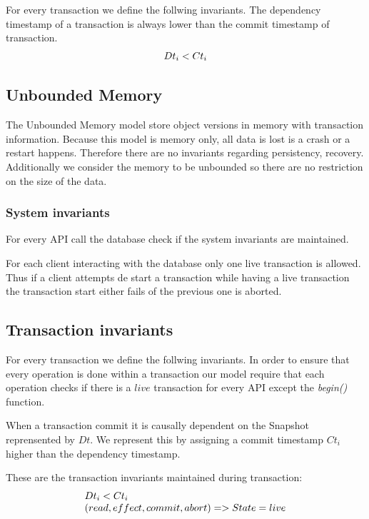 \documentclass[parallelisme]{compas2022}
\begin{document}
For every transaction we define the follwing invariants.
The dependency timestamp of a transaction is always lower than the commit timestamp of transaction.
\[
  \begin{array}{lcl}
    \emph{$Dt_i < Ct_i$}
  \end{array} 
\]

\subsection{Unbounded Memory}

The Unbounded Memory model store object versions in memory with transaction information.
Because this model is memory only, all data is lost is a crash or a restart happens.
Therefore there are no invariants regarding persistency, recovery.
Additionally we consider the memory to be unbounded so there are no restriction on the size of the data. 


\subsubsection{System invariants}

For every API call the database check if the system invariants are maintained.

For each client interacting with the database only one live transaction is allowed.
Thus if a client attempts de start a transaction while having a live transaction the transaction start either fails of the previous one is aborted.



\subsection{Transaction invariants}


For every transaction we define the follwing invariants.
In order to ensure that every operation is done within a transaction our model require that each operation checks if there is a $live$ transaction for every API except the \emph{begin()} function.

When a transaction commit it is causally dependent on the Snapshot reprensented by $Dt$.
We represent this by assigning a commit timestamp $Ct_i$ higher than the dependency timestamp.

These are the transaction invariants maintained during transaction:
\[
  \begin{array}{lcl}
    \emph{$Dt_i < Ct_i$}\\
    \emph{$(read, effect, commit, abort) => State = live$}
  \end{array} 
\]
\end{document}
